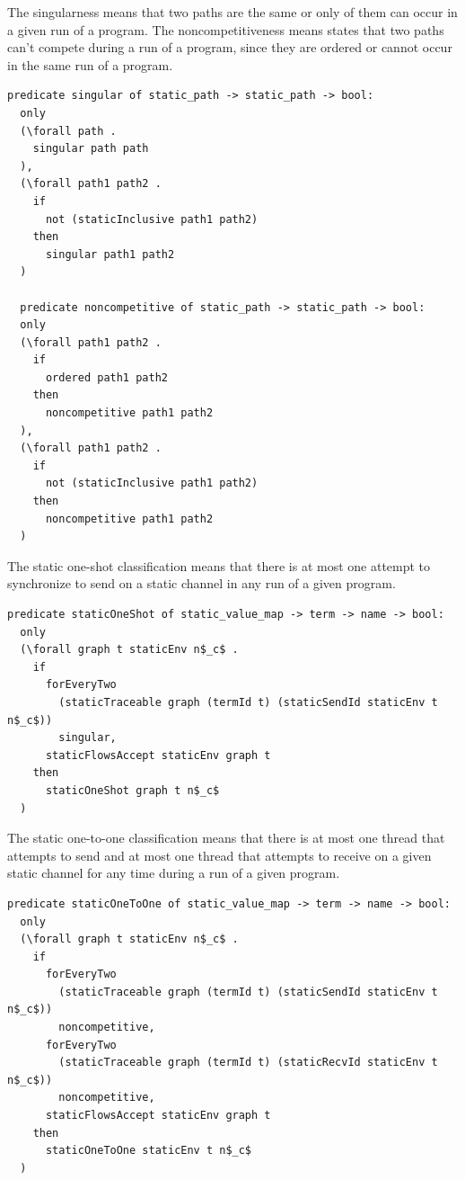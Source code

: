 \documentclass[10pt]{article}
\begin{document}
The singularness means that two paths are the same or only of them can occur in a given run of
a program. The noncompetitiveness means states that two paths can't compete during a run of a
program, since they are ordered or cannot occur in the same run of a program.

\begin{lstlisting}[language=logic, mathescape]
  predicate singular of static_path -> static_path -> bool:
  only
  (\forall path .
    singular path path
  ),
  (\forall path1 path2 .
    if
      not (staticInclusive path1 path2)
    then
      singular path1 path2
  )

  predicate noncompetitive of static_path -> static_path -> bool:
  only
  (\forall path1 path2 .
    if
      ordered path1 path2
    then
      noncompetitive path1 path2
  ),
  (\forall path1 path2 .
    if
      not (staticInclusive path1 path2)
    then
      noncompetitive path1 path2
  )
\end{lstlisting}


The static one-shot classification means that there is at most one attempt
to synchronize to send on a static channel in any run of a given program.

\begin{lstlisting}[language=logic, mathescape]
  predicate staticOneShot of static_value_map -> term -> name -> bool:
  only
  (\forall graph t staticEnv n$_c$ .
    if
      forEveryTwo
        (staticTraceable graph (termId t) (staticSendId staticEnv t n$_c$))
        singular,
      staticFlowsAccept staticEnv graph t
    then
      staticOneShot graph t n$_c$
  )
\end{lstlisting}

The static one-to-one classification means that there is at most one thread that attempts to
send and at most one thread that attempts to receive on a given static channel for any time
during a run of a given program.

\begin{lstlisting}[language=logic, mathescape]
  predicate staticOneToOne of static_value_map -> term -> name -> bool:
  only
  (\forall graph t staticEnv n$_c$ .
    if
      forEveryTwo
        (staticTraceable graph (termId t) (staticSendId staticEnv t n$_c$))
        noncompetitive, 
      forEveryTwo
        (staticTraceable graph (termId t) (staticRecvId staticEnv t n$_c$))
        noncompetitive, 
      staticFlowsAccept staticEnv graph t 
    then
      staticOneToOne staticEnv t n$_c$
  )
\end{lstlisting}
\end{document}
